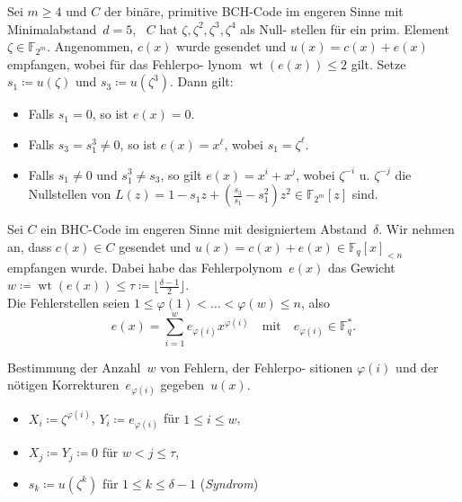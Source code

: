 \documentclass{cheat-sheet}
\newcommand{\F}{\mathbb{F}} %
\newcommand{\floor}[1]{\lfloor #1 \rfloor} %
\DeclareMathOperator{\wt}{wt} %
\newcommand*\circled[1]{\tikz[baseline=(char.base)]{
            \node[shape=circle,draw,inner sep=1pt] (char) {\scriptsize #1};}}
\begin{document}
\begin{satz}
  Sei $m \geq 4$ und $C$ der binäre, primitive BCH-Code im engeren Sinne mit Minimalabstand~$d = 5$, \dh{}~$C$ hat $\zeta, \zeta^2, \zeta^3, \zeta^4$ als Null- stellen für ein prim. Element $\zeta \in \F_{2^m}$.
  Angenommen, $c(x)$ wurde gesendet und $u(x) = c(x) + e(x)$ empfangen, wobei für das Fehlerpo- lynom $\wt(e(x)) \leq 2$ gilt.
  Setze $s_1 \coloneqq u(\zeta)$ und $s_3 \coloneqq u(\zeta^3)$.
  Dann gilt:
  \begin{itemize}
    \item Falls $s_1 = 0$, so ist $e(x) = 0$.
    \item Falls $s_3 = s_1^3 \neq 0$, so ist $e(x) = x^\ell$, wobei $s_1 = \zeta^\ell$.
    \item Falls $s_1 \neq 0$ und $s_1^3 \neq s_3$, so gilt $e(x) = x^i + x^j$, wobei $\zeta^{-i}$ u. $\zeta^{-j}$ die Nullstellen von $L(z) = 1 - s_1 z + (\tfrac{s_3}{s_1} - s_1^2) z^2 \in \F_{2^m}[z]$ sind.
  \end{itemize}
\end{satz}


\begin{situation}
  Sei $C$ ein BHC-Code im engeren Sinne mit designiertem Abstand~$\delta$.
  Wir nehmen an, dass $c(x) \in C$ gesendet und $u(x) = c(x) + e(x) \in \F_q[x]_{< n}$ empfangen wurde.
  Dabei habe das Fehlerpolynom~$e(x)$ das Gewicht $w \coloneqq \wt(e(x)) \leq \tau \coloneqq \floor{\tfrac{\delta-1}{2}}$. \\
  Die Fehlerstellen seien $1 \leq \varphi(1) < \ldots < \varphi(w) \leq n$, also
  \[
    e(x) = \sum_{i=1}^w e_{\varphi(i)} x^{\varphi(i)}
    \quad \text{mit} \quad
    e_{\varphi(i)} \in \F_q^*.
  \]
\end{situation}

\begin{ziel}
  Bestimmung \circled{1} der Anzahl~$w$ von Fehlern, \circled{2} der Fehlerpo- sitionen $\varphi(i)$ und \circled{3} der nötigen Korrekturen~$e_{\varphi(i)}$ gegeben~$u(x)$.
\end{ziel}

\begin{nota}
  \begin{minipage}[t]{0.7 \linewidth}
    \begin{itemize}
      \item $X_i \coloneqq \zeta^{\varphi(i)}$,
      $Y_i \coloneqq e_{\varphi(i)}$ für $1 \leq i \leq w$,
      \item $X_j \coloneqq Y_j \coloneqq 0$ für $w < j \leq \tau$,
      \item $s_k \coloneqq u(\zeta^k)$ für $1 \leq k \leq \delta - 1$ \quad (\textit{Syndrom})
    \end{itemize}
  \end{minipage}
\end{nota}
\end{document}
